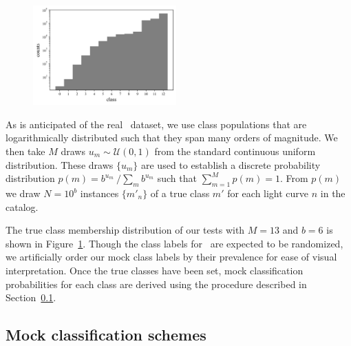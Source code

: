 \begin{figure}
	\begin{center}
    \includegraphics[width=0.49\textwidth]{./fig/complete_counts.png}
		\caption{}
		\label{fig:classdist}
	\end{center}
\end{figure}

As is anticipated of the real \lsst\ dataset, we use class populations that are logarithmically distributed such that they span many orders of magnitude.
We then take $M$ draws $u_{m} \sim \mathcal{U}(0, 1)$ from the standard continuous uniform distribution.
These draws $\{u_{m}\}$ are used to establish a discrete probability distribution $p(m) = b^{u_{m}}\ / \sum_{m} b^{u_{m}}$ such that $\sum_{m=1}^{M} p(m) = 1$.
From $p(m)$ we draw $N = 10^{b}$ instances $\{m'_{n}\}$ of a true class $m'$ for each light curve $n$ in the catalog.

The true class membership distribution of our tests with $M = 13$ and $b = 6$ is shown in Figure~\ref{fig:classdist}.
Though the class labels for \plasticc\ are expected to be randomized, we artificially order our mock class labels by their prevalence for ease of visual interpretation.
Once the true classes have been set, mock classification probabilities for each class are derived using the procedure described in Section~\ref{sec:mockdata}.

\subsection{Mock classification schemes}
\label{sec:mockdata}

